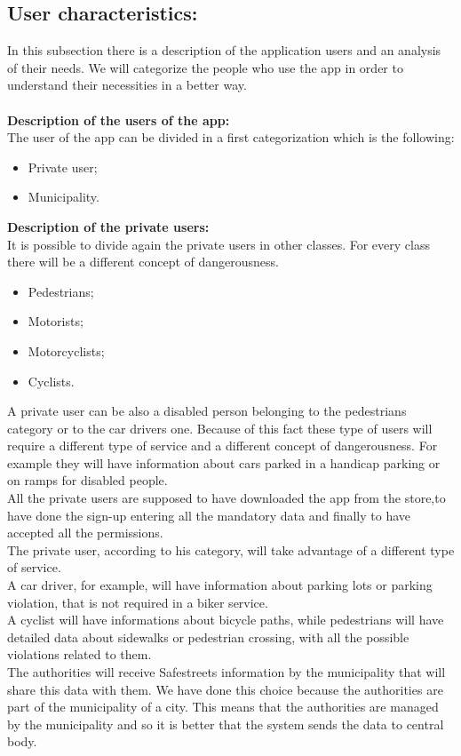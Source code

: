 \documentclass[titlepage]{article}
\begin{document}
\subsection{User characteristics: }
In this subsection there is a description of the application users and an analysis of their needs. We will categorize the people who use the app in order to understand their necessities in a better way.\\
\textbf{\\Description of the users of the app:\\}
The user of the app can be divided in a first categorization which is the following:
\begin{itemize}
	\item Private user;
	\item Municipality.\\
\end{itemize}
\textbf{Description of the private users: }\\ 
It is possible to divide again the private users in other classes. For every class there will be a different concept of dangerousness.
\begin{itemize}
	\item Pedestrians;
	\item Motorists;
	\item Motorcyclists;
	\item Cyclists.
\end{itemize}
A private user can be also a disabled person belonging to the pedestrians category or to the car drivers one. Because of this fact these type of users will require a different type of service and a different concept of dangerousness. For example they will have information about cars parked in a handicap parking or on ramps for disabled people.\\
All the private users are supposed to have downloaded the app from the store,to have done the sign-up entering all the mandatory data and finally to have accepted all the permissions.\\
The private user, according to his category, will take advantage of a different type of service.\\
A car driver, for example, will have information about parking lots or parking violation, that is not required in a biker service.\\
A cyclist will have informations about bicycle paths, while pedestrians will have detailed data about sidewalks or pedestrian crossing, with all the possible violations related to them. \\
The authorities will receive Safestreets information by the municipality that will share this data with them. We have done this choice because the authorities are part of the municipality of a city. This means that the authorities are managed by the municipality and so it is better that the system sends the data to central body.
\end{document}
